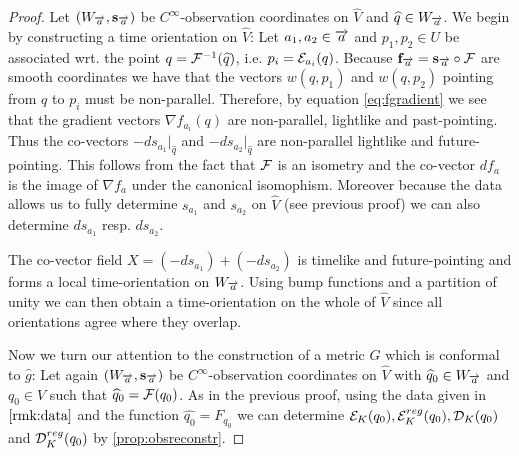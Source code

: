 \begin{proof}
    Let $(W_\aa,\mathbf{s}_\aa)$ be $C^\infty$-observation coordinates on $\widehat{V}$ and $\widehat{q}\in W_\aa$.
    We begin by constructing a time orientation on $\widehat{V}$:
    Let $a_1, a_2\in \aa$ and $p_1,p_2\in U$ be associated wrt. the point $q=\F^{-1}(\widehat{q})$, i.e. $p_i=\mc{E}_{a_i}(q)$.
    Because $\mathbf{f}_\aa = \mathbf{s}_\aa \circ \F$ are smooth coordinates we have that the vectors $w(q,p_1)$ and $w(q,p_2)$ pointing from $q$ to $p_i$ must be non-parallel. Therefore, by equation \ref{eq:fgradient} we see that the gradient vectors $\nabla f_{a_i}(q)$ are non-parallel, lightlike and past-pointing. 
    Thus the co-vectors $-ds_{a_1}\rvert_{\widehat{q}}$ and $-ds_{a_2}\rvert_{\widehat{q}}$ are non-parallel lightlike and future-pointing. This follows from the fact that $\F$ is an isometry and the co-vector $df_a$ is the image of  $\nabla f_a$ under the canonical isomophism. Moreover because the data allows us to fully determine $s_{a_1}$ and $s_{a_2}$ on $\widehat{V}$ (see previous proof) we can also determine $ds_{a_1}$ resp. $ds_{a_2}$.
    
    The co-vector field $X=(-ds_{a_1})+(-ds_{a_2})$ is timelike and future-pointing and forms a local time-orientation on $W_\aa$. Using bump functions and a partition of unity we can then obtain a time-orientation on the whole of $\widehat{V}$ since all orientations agree where they overlap.
    
    Now we turn our attention to the construction of a metric $G$ which is conformal to $\widehat{g}$: Let again $(W_\aa,\mathbf{s}_\aa)$ be $C^\infty$-observation coordinates on $\widehat{V}$ with $\widehat{q}_0\in W_\aa$ and $q_0\in V$ such that $\widehat{q}_0=\F(q_0)$. As in the previous proof, using the data given in $\ref{rmk:data}$ and the function $\widehat{q_0}=F_{q_0}$ we can determine $\ee(q_0), \er(q_0), \mc{D}_K(q_0)$ and $\mc{D}^{reg}_K(q_0)$ by \ref{prop:obsreconstr}.
    

\end{proof}

